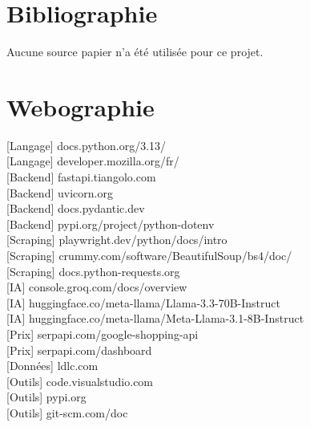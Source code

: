 \documentclass[a4paper, 12pt, twoside]{article}
\begin{document}
\section{Bibliographie}
Aucune source papier n'a été utilisée pour ce projet.
\newpage


\section{Webographie}
[Langage] docs.python.org/3.13/ \\

[Langage] developer.mozilla.org/fr/ \\

[Backend] fastapi.tiangolo.com \\

[Backend] uvicorn.org \\

[Backend] docs.pydantic.dev \\

[Backend] pypi.org/project/python-dotenv \\

[Scraping] playwright.dev/python/docs/intro \\

[Scraping] crummy.com/software/BeautifulSoup/bs4/doc/ \\

[Scraping] docs.python-requests.org \\

[IA] console.groq.com/docs/overview \\

[IA] huggingface.co/meta-llama/Llama-3.3-70B-Instruct \\

[IA] huggingface.co/meta-llama/Meta-Llama-3.1-8B-Instruct \\

[Prix] serpapi.com/google-shopping-api \\

[Prix] serpapi.com/dashboard \\

[Données] ldlc.com \\

[Outils] code.visualstudio.com\\

[Outils] pypi.org \\

[Outils] git-scm.com/doc \\
\end{document}
